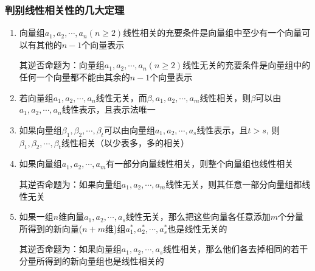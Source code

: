 \documentclass[12pt, a4paper, oneside, UTF8]{ctexbook}
\begin{document}
\subsubsection{判别线性相关性的几大定理}
\begin{enumerate}
    \item 向量组$a_1, a_2, \cdots, a_n(n\geq2)$线性相关的充要条件是向量组中至少有一个向量可以有其他的$n-1$个向量表示
    \begin{rmk}
        其逆否命题为：向量组$a_1, a_2, \cdots, a_n(n\geq2)$线性无关的充要条件是向量组中的任何一个向量都不能由其余的$n-1$个向量表示
    \end{rmk}
    \item 若向量组$a_1, a_2, \cdots, a_n$线性无关，而$\beta, a_1, a_2, \cdots, a_m$线性相关，则$\beta$可以由$a_1, a_2, \cdots, a_n$线性表示，且表示法唯一
    \item 如果向量组$\beta_1, \beta_2, \cdots, \beta_t$可以由向量组$a_1, a_2, \cdots, a_s$线性表示，且$t>s$, 则$\beta_1, \beta_2, \cdots, \beta_t$线性相关（以少表多，多的相关）
    \item 如果向量组$a_1, a_2, \cdots, a_m$有一部分向量线性相关，则整个向量组也线性相关
    \begin{rmk}
        其逆否命题为：如果向量组$a_1, a_2, \cdots, a_m$线性无关，则其任意一部分向量组都线性无关
    \end{rmk}
    \item 如果一组$n$维向量$a_1, a_2, \cdots, a_s$线性无关，那么把这些向量各任意添加$m$个分量所得到的新向量($n+m$维)组$a_1^*, a_2^*, \cdots, a_s^*$也是线性无关的
    \begin{rmk}
        其逆否命题为：如果向量组$a_1, a_2, \cdots, a_s$线性相关，那么他们各去掉相同的若干分量所得到的新向量组也是线性相关的
    \end{rmk}
\end{enumerate}
\end{document}
